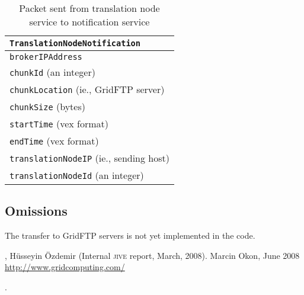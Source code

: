 \documentclass[11pt]{article}
\begin{document}
\begin{table}\label{tab:toNotification}
\begin{tabular}{l}
\texttt{TranslationNodeNotification}\\ \hline
\texttt{brokerIPAddress} \\
\texttt{chunkId} (an integer) \\
\texttt{chunkLocation} (ie., GridFTP server)  \\
\texttt{chunkSize} (bytes)\\
\texttt{startTime} (vex format)\\ 
\texttt{endTime} (vex format)\\
\texttt{translationNodeIP} (ie., sending host) \\
\texttt{translationNodeId} (an integer)
\end{tabular}
\caption{Packet sent from translation node service to notification service} 
\end{table}

\subsection{Omissions}
The transfer to GridFTP servers is not yet implemented in the code.

\begin{thebibliography}{99} 
,
  H\"usseyin \"Ozdemir (Internal \textsc{jive} report, March, 2008).
 Marcin Okon, June 2008 
\url{http://www.gridcomputing.com/}
\end{thebibliography}.
\end{document}
